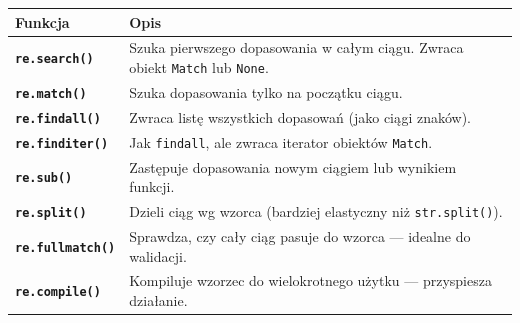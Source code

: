 \documentclass[
  polish,
  letterpaper,
  DIV=11,
  numbers=noendperiod]{scrreprt}
\newcounter{none} %
\begin{document}
{\def\LTcaptype{none} %
\begin{longtable}[]{@{}
  >{\raggedright\arraybackslash}p{}
  >{\raggedright\arraybackslash}p{}@{}}
\toprule\noalign{}
\begin{minipage}[b]{\linewidth}\raggedright
Funkcja
\end{minipage} & \begin{minipage}[b]{\linewidth}\raggedright
Opis
\end{minipage} \\
\midrule\noalign{}
\endhead
\bottomrule\noalign{}
\endlastfoot
\textbf{\texttt{re.search()}} & Szuka pierwszego dopasowania w całym
ciągu. Zwraca obiekt \texttt{Match} lub \texttt{None}. \\
\textbf{\texttt{re.match()}} & Szuka dopasowania tylko na początku
ciągu. \\
\textbf{\texttt{re.findall()}} & Zwraca listę wszystkich dopasowań (jako
ciągi znaków). \\
\textbf{\texttt{re.finditer()}} & Jak \texttt{findall}, ale zwraca
iterator obiektów \texttt{Match}. \\
\textbf{\texttt{re.sub()}} & Zastępuje dopasowania nowym ciągiem lub
wynikiem funkcji. \\
\textbf{\texttt{re.split()}} & Dzieli ciąg wg wzorca (bardziej
elastyczny niż \texttt{str.split()}). \\
\textbf{\texttt{re.fullmatch()}} & Sprawdza, czy cały ciąg pasuje do
wzorca --- idealne do walidacji. \\
\textbf{\texttt{re.compile()}} & Kompiluje wzorzec do wielokrotnego
użytku --- przyspiesza działanie. \\
\end{longtable}
}
\end{document}
